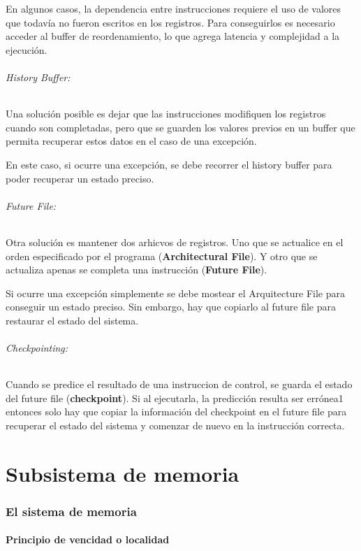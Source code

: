 En algunos casos, la dependencia entre instrucciones requiere el uso de valores que todavía no fueron escritos en los registros. Para conseguirlos es necesario acceder al buffer de reordenamiento, lo que agrega latencia y complejidad a la ejecución.

\paragraph{History Buffer:} Una solución posible es dejar que las instrucciones modifiquen los registros cuando son completadas, pero que se guarden los valores previos en un buffer que permita recuperar estos datos en el caso de una excepción.

En este caso, si ocurre una excepción, se debe recorrer el history buffer para poder recuperar un estado preciso.

\paragraph{Future File:} Otra solución es mantener dos arhicvos de registros. Uno que se actualice en el orden especificado por el programa (\textbf{Architectural File}). Y otro que se actualiza apenas se completa una instrucción (\textbf{Future File}).

Si ocurre una excepción simplemente se debe mostear el Arquitecture File para conseguir un estado preciso. Sin embargo, hay que copiarlo al future file para restaurar el estado del sistema.

\paragraph{Checkpointing:} Cuando se predice el resultado de una instruccion de control, se guarda el estado del future file (\textbf{checkpoint}). Si al ejecutarla, la predicción resulta ser errónea1 entonces solo hay que copiar la información del checkpoint en el future file para recuperar el estado del sistema y comenzar de nuevo en la instrucción correcta.  

\newpage
\part{Subsistema de memoria}
\section{El sistema de memoria}
\subsection{Principio de vencidad o localidad}
